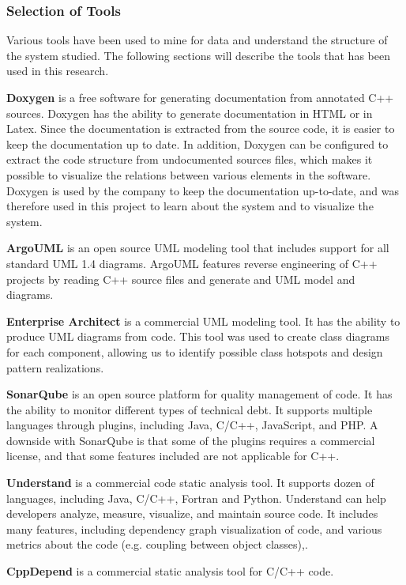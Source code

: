 \subsubsection{Selection of Tools}
Various tools have been used to mine for data and understand the structure of the system studied. The following sections will describe the tools that has been used in this research.

\textbf{Doxygen} is a free software for generating documentation from annotated C++ sources. Doxygen has the ability to generate documentation in HTML or in Latex. Since the documentation is extracted from the source code, it is easier to keep the documentation up to date. In addition, Doxygen can be configured to extract the code structure from undocumented sources files, which makes it possible to visualize the relations between various elements in the software. Doxygen is used by the company to keep the documentation up-to-date, and was therefore used in this project to learn about the system and to visualize the system.

\textbf{ArgoUML} is an open source UML modeling tool that includes support for all standard UML 1.4 diagrams\cite{argouml}. ArgoUML features reverse engineering of C++ projects by reading C++ source files and generate and UML model and diagrams. 

\textbf{Enterprise Architect} is a commercial UML modeling tool. It has the ability to produce UML diagrams from code. This tool was used to create class diagrams for each component, allowing us to identify possible class hotspots and design pattern realizations.

\textbf{SonarQube} is an open source platform for quality management of code. It has the ability to monitor different types of technical debt. It supports multiple languages through plugins, including Java, C/C++, JavaScript, and PHP. A downside with SonarQube is that some of the plugins requires a commercial license, and that some features included are not applicable for C++.

\textbf{Understand}  is a commercial code static analysis tool. It supports dozen of languages, including Java, C/C++, Fortran and Python. Understand can help developers analyze, measure, visualize, and maintain source code. It includes many features, including dependency graph visualization of code, and various metrics about the code (e.g. coupling between object classes),. 

\textbf{CppDepend} is a commercial static analysis tool for C/C++ code. 


